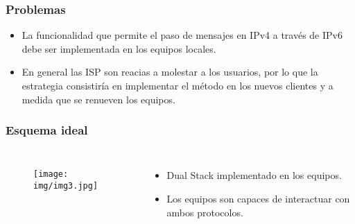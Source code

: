 \begin{frame}
  \frametitle{Problemas}
  	\begin{itemize}[itemsep=2em]
		\item
			La funcionalidad que permite el paso de mensajes
			en IPv4 a través de IPv6 debe ser implementada
			en los equipos locales.
		\item
			En general las ISP son reacias a molestar a los
			usuarios, por lo que la estrategia consistiría
			en implementar el método en los nuevos clientes
			y a medida que se renueven los equipos.
	\end{itemize}
\end{frame}

\begin{frame}
  \frametitle{Esquema ideal}
  \begin{columns}[t]
    	\begin{figure}
		\centering
		\texttt{[image: img/img3.jpg]}
	\end{figure}
    	\begin{itemize}[itemsep=2em]
		\item
			Dual Stack implementado en los equipos.
		\item
			Los equipos son capaces de interactuar
			con ambos protocolos.
	\end{itemize}
  \end{columns}
\end{frame}





